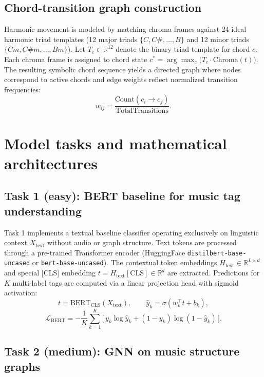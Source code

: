 \documentclass[10pt]{article}
\begin{document}
\subsection{Chord-transition graph construction}

Harmonic movement is modeled by matching chroma frames against 24 ideal harmonic triad templates (12 major triads $\{C, C\#, \ldots, B\}$ and 12 minor triads $\{Cm, C\#m, \ldots, Bm\}$). Let $T_c \in \mathbb{R}^{12}$ denote the binary triad template for chord $c$. Each chroma frame is assigned to chord state $c^{*} = \arg\max_c \big(T_c \cdot \text{Chroma}(t)\big)$. The resulting symbolic chord sequence yields a directed graph where nodes correspond to active chords and edge weights reflect normalized transition frequencies:
\begin{equation}
  w_{ij} = \frac{\text{Count}(c_i \rightarrow c_j)}{\text{TotalTransitions}}.
\end{equation}

\section{Model tasks and mathematical architectures}

\subsection{Task 1 (easy): BERT baseline for music tag understanding}

Task 1 implements a textual baseline classifier operating exclusively on linguistic context $X_{\text{text}}$ without audio or graph structure. Text tokens are processed through a pre-trained Transformer encoder (HuggingFace \texttt{distilbert-base-uncased} or \texttt{bert-base-uncased}). The contextual token embeddings $H_{\text{text}} \in \mathbb{R}^{L \times d}$ and special [CLS] embedding $t = H_{\text{text}}[\text{CLS}] \in \mathbb{R}^d$ are extracted. Predictions for $K$ multi-label tags are computed via a linear projection head with sigmoid activation:
\begin{equation}
  t = \text{BERT}_{\text{CLS}}(X_{\text{text}}), \qquad \hat{y}_k = \sigma(w_k^{\top} t + b_k),
\end{equation}
\begin{equation}
  \mathcal{L}_{\text{BERT}} = -\frac{1}{K}\sum_{k=1}^{K} \big[\, y_k \log \hat{y}_k + (1-y_k)\log(1-\hat{y}_k) \,\big].
\end{equation}

\subsection{Task 2 (medium): GNN on music structure graphs}
\end{document}
